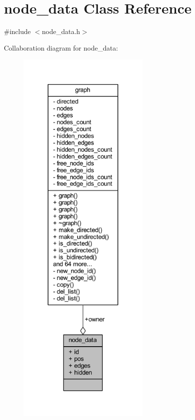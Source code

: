 \hypertarget{classnode__data}{}\section{node\+\_\+data Class Reference}
\label{classnode__data}


{\ttfamily \#include $<$node\+\_\+data.\+h$>$}



Collaboration diagram for node\+\_\+data\+:\nopagebreak
\begin{figure}[H]
\begin{center}
\leavevmode
\includegraphics[height=550pt]{classnode__data__coll__graph}
\end{center}
\end{figure}
